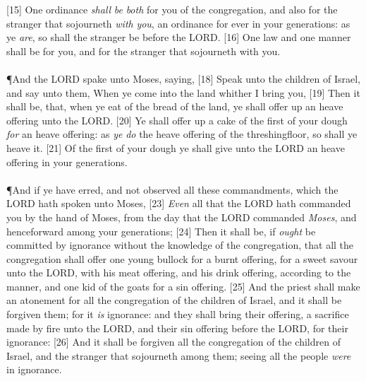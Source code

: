 [15] \textcolor[cmyk]{0.99998,1,0,0}{One ordinance \emph{shall} \emph{be} \emph{both} for you of the congregation, and also for the stranger that sojourneth \emph{with} \emph{you}, an ordinance for ever in your generations: as ye \emph{are}, so shall the stranger be before the LORD.}
[16] \textcolor[cmyk]{0.99998,1,0,0}{One law and one manner shall be for you, and for the stranger that sojourneth with you.}\\
\\
\P \textcolor[cmyk]{0.99998,1,0,0}{And the LORD spake unto Moses, saying,}
[18] \textcolor[cmyk]{0.99998,1,0,0}{Speak unto the children of Israel, and say unto them, When ye come into the land whither I bring you,}
[19] \textcolor[cmyk]{0.99998,1,0,0}{Then it shall be, that, when ye eat of the bread of the land, ye shall offer up an heave offering unto the LORD.}
[20] \textcolor[cmyk]{0.99998,1,0,0}{Ye shall offer up a cake of the first of your dough \emph{for} an heave offering: as \emph{ye} \emph{do} the heave offering of the threshingfloor, so shall ye heave it.}
[21] \textcolor[cmyk]{0.99998,1,0,0}{Of the first of your dough ye shall give unto the LORD an heave offering in your generations.}\\
\\
\P \textcolor[cmyk]{0.99998,1,0,0}{And if ye have erred, and not observed all these commandments, which the LORD hath spoken unto Moses,}
[23] \textcolor[cmyk]{0.99998,1,0,0}{\emph{Even} all that the LORD hath commanded you by the hand of Moses, from the day that the LORD commanded \emph{Moses}, and henceforward among your generations;}
[24] \textcolor[cmyk]{0.99998,1,0,0}{Then it shall be, if \emph{ought} be committed by ignorance without the knowledge of the congregation, that all the congregation shall offer one young bullock for a burnt offering, for a sweet savour unto the LORD, with his meat offering, and his drink offering, according to the manner, and one kid of the goats for a sin offering.}
[25] \textcolor[cmyk]{0.99998,1,0,0}{And the priest shall make an atonement for all the congregation of the children of Israel, and it shall be forgiven them; for it \emph{is} ignorance: and they shall bring their offering, a sacrifice made by fire unto the LORD, and their sin offering before the LORD, for their ignorance:}
[26] \textcolor[cmyk]{0.99998,1,0,0}{And it shall be forgiven all the congregation of the children of Israel, and the stranger that sojourneth among them; seeing all the people \emph{were} in ignorance.}\\
\\
